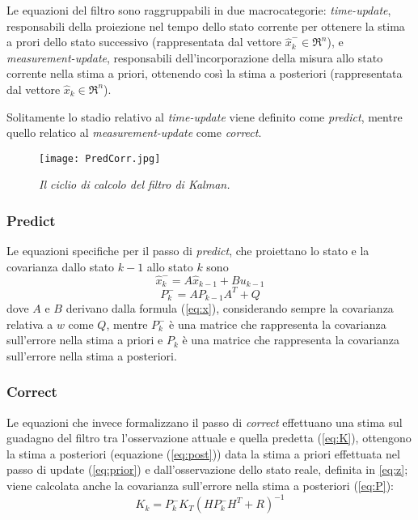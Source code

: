 Le equazioni del filtro sono raggruppabili in due macrocategorie: \textit{time-update}, responsabili della proiezione nel tempo dello stato corrente per ottenere la stima a prori dello stato successivo (rappresentata dal vettore $\hat{x}_k^- \in \Re^n$), e \textit{measurement-update}, responsabili dell'incorporazione della misura allo stato corrente nella stima a priori, ottenendo così la stima a posteriori (rappresentata dal vettore $\hat{x}_k \in \Re^n$). 

Solitamente lo stadio relativo al \textit{time-update} viene definito come \textit{predict}, mentre quello relatico al \textit{measurement-update} come \textit{correct}.

\begin{figure}[hb]
\centering
	\texttt{[image: PredCorr.jpg]}
\caption{\textit{Il ciclio di calcolo del filtro di Kalman.}\label{fig:predictcorrect}}
\end{figure}
\subsubsection{Predict}
Le equazioni specifiche per il passo di \textit{predict}, che proiettano lo stato e la covarianza dallo stato $k-1$ allo stato $k$ sono 
\begin{equation}\label{eq:prior}
\hat{x}_k^-=A \hat{x}_{k-1}+Bu_{k-1}
\end{equation} 
\begin{equation}
P_k^-=A P_{k-1}A^T+Q
\end{equation} 
dove $A$ e $B$ derivano dalla formula (\ref{eq:x}), considerando sempre la covarianza relativa a $w$ come $Q$, mentre $P_k^-$ è una matrice che rappresenta la covarianza sull'errore nella stima a priori e $P_k$ è una matrice che rappresenta la covarianza sull'errore nella stima a posteriori.
\subsubsection{Correct}

Le equazioni che invece formalizzano il passo di \textit{correct} effettuano una stima sul guadagno del filtro tra l'osservazione attuale e quella predetta (\ref{eq:K}), ottengono la stima a posteriori  (equazione (\ref{eq:post})) data la stima a priori effettuata nel passo di update (\ref{eq:prior}) e dall'osservazione dello stato reale, definita in \ref{eq:z}; viene calcolata anche la covarianza sull'errore nella stima a posteriori (\ref{eq:P}):
\begin{equation}\label{eq:K}
K_k = P_k^- K_T(HP_k^-H^T+R)^{-1}
\end{equation} 

